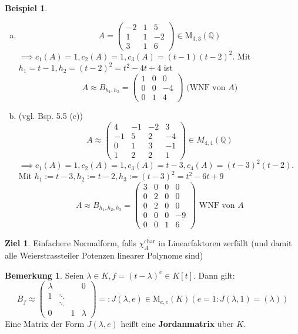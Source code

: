 \documentclass[a4paper, titlepage]{article}
\theoremstyle{definition}
\newtheorem{bsp}[satz]{Beispiel}
\newtheorem{bem}[satz]{Bemerkung}
\newtheorem*{ziel}{Ziel}
\newcommand{\Q}{\mathbb{Q}}
\newcommand{\M}{\mathrm{M}}
\begin{document}
\begin{bsp}
    \begin{enumerate}[(a)]
        \item $$A=\begin{pmatrix}
         -2 & 1 & 5\\
        1 & 1 &-2\\
        3 & 1 & 6
        \end{pmatrix}\in\M_{3,3}(\Q)$$
        $\implies c_1(A)=1,c_2(A)=1,c_3(A)=(t-1)(t-2)^2.$ Mit $h_1=t-1,h_2=(t-2)^2=t^2-4t+4$ ist 
        $$A\approx B_{h_1,h_2}=
            \left(\begin{array}{c|cc}
                1 & 0 &0\\
                \hline 0 & 0& -4\\
                0 & 1 & 4
            \end{array}\right) \text{ (WNF von } A)$$
            \item (vgl. Bsp. 5.5 (c))
            $$A\approx \begin{pmatrix}
                4 & -1 & -2 & 3 \\
                -1 & 5 & 2 & -4\\
                0 & 1 & 3 &-1\\
                1 & 2 & 2 & 1 
            \end{pmatrix} \in M_{4,4}(\Q)$$
            $\implies c_1(A)=1,c_2(A)=1,c_3(A)=t-3,c_4(A)=(t-3)^2(t-2).$ Mit $h_1:=t-3,h_2:=t-2,h_3:=(t-3)^2=t^2-6t+9$
            $$A\approx B_{h_1,h_2,h_3}=\left(\begin{array}{cccc}
                3 & 0 & 0& 0\\
                 0 &2  & 0 & 0\\
                0 & 2 &  0& 0\\
                0& 0&  0& -9\\
                0 & 0& 1 & 6
            \end{array}\right)\text{ WNF von }A$$
        \end{enumerate}
    \end{bsp}
    \begin{ziel} Einfachere Normalform, falls $\chi_{A}^{\text{char}}$ in Linearfaktoren zerfällt (und damit alle Weierstrassteiler Potenzen linearer Polynome sind)
    \end{ziel}
    \begin{bem}
        Seien $\lambda \in K, f=(t-\lambda)^e\in K[t].$ Dann gilt:
            $$B_f\approx \begin{pmatrix}
                \lambda &  & &0\\
                1 &\ddots & &\\
                & \ddots & & \\
                0 & & 1 & \lambda 
            \end{pmatrix}=: J(\lambda, e )\in \M_{e,e}(K) (e=1: J(\lambda, 1)=(\lambda))$$
            Eine Matrix der Form $J(\lambda, e)$ heißt eine \textbf{Jordanmatrix} über $K$.
        \end{bem}
\end{document}
